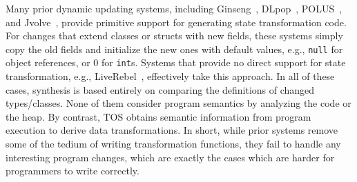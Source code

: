 \documentclass[natbib,10pt]{sigplanconf}
\newcommand{\code}[1]{\lstinline|#1|\xspace}
\newcommand{\TOS}{TOS\xspace}
\newcommand{\mwh}[1]{\textcolor{blue}{Mike: #1}}
\begin{document}


Many prior dynamic updating systems, including
Ginseng~\cite{neamtiu06dsu}, DLpop~\cite{HicksNettles03},
POLUS~\cite{chen:icse07}, and Jvolve~\cite{jvolve}, provide primitive
support for generating state transformation code.  For changes that
extend classes or structs with new fields, these systems
simply copy the old fields and initialize the new ones with default
values, e.g., \code{null} for object references, or 0 for
\code{int}\hspace{-0.5em}s.  Systems that provide no direct support for state
transformation, e.g., LiveRebel~\cite{javarebel}, effectively take
this approach.  In all of these cases, synthesis is based entirely on
comparing the definitions of changed types/classes.  None of them
consider program semantics by analyzing the code or the heap.  By contrast,
\TOS obtains semantic information from program execution to derive
data transformations.
In short, while prior systems remove some of the tedium of writing
transformation functions, they fail to handle any interesting program
changes, which are exactly the cases which are harder
for programmers to write correctly.


\end{document}
